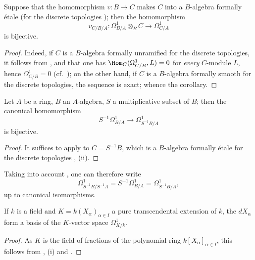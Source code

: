 \begin{corollary}[20.5.8]
\label{0.20.5.8}
Suppose that the homomorphism $v:B\to C$ makes $C$ into a $B$-algebra formally \'{e}tale \textup{(}for the discrete topologies \textup{)}; then the homomorphism 
\[
  v_{C/B/A}:\Omega^1_{B/A}\otimes_B C\to\Omega^1_{C/A}
\]
is bijective.
\end{corollary}

\begin{proof}
Indeed, if $C$ is a $B$-algebra formally unramified for the discrete topologies, it follows from ,  and  that one has $\Hom_C(\Omega^1_{C/B},L)=0$ for \emph{every} $C$-module $L$, hence $\Omega^1_{C/B}=0$ (cf.\ ); on the other hand, if $C$ is a $B$-algebra formally smooth for the discrete topologies, the sequence  is exact; whence the corollary.
\end{proof}

\begin{corollary}[20.5.9]
\label{0.20.5.9}
Let $A$ be a ring, $B$ an $A$-algebra, $S$ a multiplicative subset of $B$; then the canonical homomorphism
\begin{equation}
\tag{20.5.9.1}
  \label{0.20.5.9.1}
  S^{-1}\Omega^1_{B/A}\to\Omega^1_{S^{-1}B/A}
\end{equation}
is bijective.
\end{corollary}

\begin{proof}
It suffices to apply  to $C=S^{-1}B$, which is a $B$-algebra formally \'{e}tale for the discrete topologies , (ii).
\end{proof}

Taking into account , one can therefore write
\begin{equation}
\tag{20.5.9.2}
  \label{0.20.5.9.2}
  \Omega^1_{S^{-1}B/S^{-1}A} = S^{-1}\Omega^1_{B/A} = \Omega^1_{S^{-1}B/A},
\end{equation}
up to canonical isomorphisms.

\begin{corollary}[20.5.10]
\label{0.20.5.10}
If $k$ is a field and $K=k(X_\alpha)_{\alpha\in I}$ a pure transcendental extension of $k$, the $dX_\alpha$ form a basis of the $K$-vector space $\Omega^1_{K/k}$.
\end{corollary}

\begin{proof}
As $K$ is the field of fractions of the polynomial ring $k[X_\alpha]_{\alpha\in I}$, this follows from , (i) and .
\end{proof}

